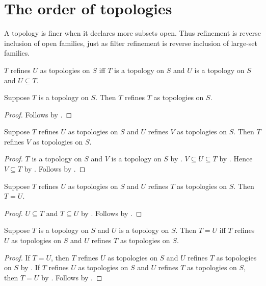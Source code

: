 \section{The order of topologies}




A topology is finer when it declares more subsets open.  Thus refinement is
reverse inclusion of open families, just as filter refinement is reverse
inclusion of large-set families.

\begin{definition}\label{topology_refines}
    $T$ refines $U$ as topologies on $S$ iff
        $T$ is a topology on $S$ and $U$ is a topology on $S$ and
        $U\subseteq T$.
\end{definition}

\begin{proposition}\label{topology_refines_reflexive}
    Suppose $T$ is a topology on $S$.
    Then $T$ refines $T$ as topologies on $S$.
\end{proposition}
\begin{proof}
    Follows by .
\end{proof}

\begin{proposition}\label{topology_refines_transitive}
    Suppose $T$ refines $U$ as topologies on $S$ and
        $U$ refines $V$ as topologies on $S$.
    Then $T$ refines $V$ as topologies on $S$.
\end{proposition}
\begin{proof}
    $T$ is a topology on $S$ and $V$ is a topology on $S$ by
        .
    $V\subseteq U\subseteq T$ by .
    Hence $V\subseteq T$ by .
    Follows by .
\end{proof}

\begin{proposition}\label{topology_refines_antisymmetric}
    Suppose $T$ refines $U$ as topologies on $S$ and
        $U$ refines $T$ as topologies on $S$.
    Then $T=U$.
\end{proposition}
\begin{proof}
    $U\subseteq T$ and $T\subseteq U$ by .
    Follows by .
\end{proof}

\begin{theorem}\label{topology_equal_iff_mutually_refine}
    Suppose $T$ is a topology on $S$ and $U$ is a topology on $S$.
    Then $T=U$ iff $T$ refines $U$ as topologies on $S$ and
        $U$ refines $T$ as topologies on $S$.
\end{theorem}
\begin{proof}
    If $T=U$, then $T$ refines $U$ as topologies on $S$ and
        $U$ refines $T$ as topologies on $S$ by
        .
    If $T$ refines $U$ as topologies on $S$ and
        $U$ refines $T$ as topologies on $S$, then $T=U$ by
        .
    Follows by \auto.
\end{proof}

